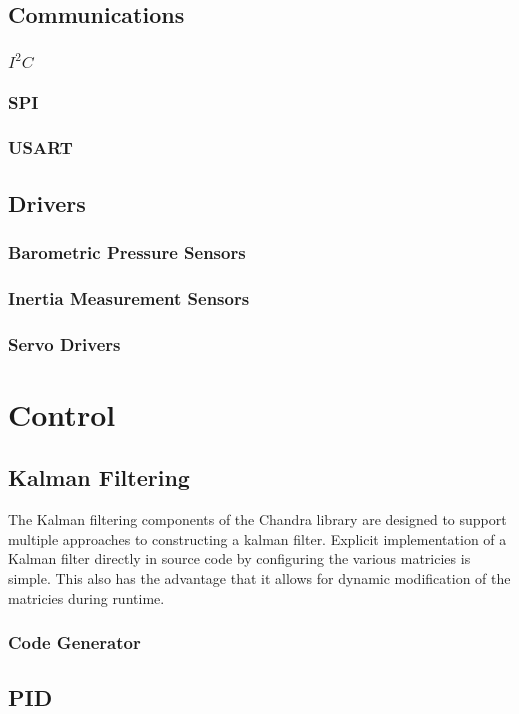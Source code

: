 \documentclass[12pt,letterpaper,article]{memoir} %
\begin{document}
\subsection{Communications}
\subsubsection{$I^{2}C$}
\subsubsection{SPI}
\subsubsection{USART}
\subsection{Drivers}
\subsubsection{Barometric Pressure Sensors}
\subsubsection{Inertia Measurement Sensors}
\subsubsection{Servo Drivers}

\section{Control}
\subsection{Kalman Filtering}
The Kalman filtering components of the Chandra library are designed to support multiple approaches to constructing a kalman filter.  Explicit implementation of a Kalman filter directly in source code by configuring the various matricies is simple.  This also has the advantage that it allows for dynamic modification of the matricies during runtime.
\subsubsection{Code Generator}

\subsection{PID}
\end{document}
